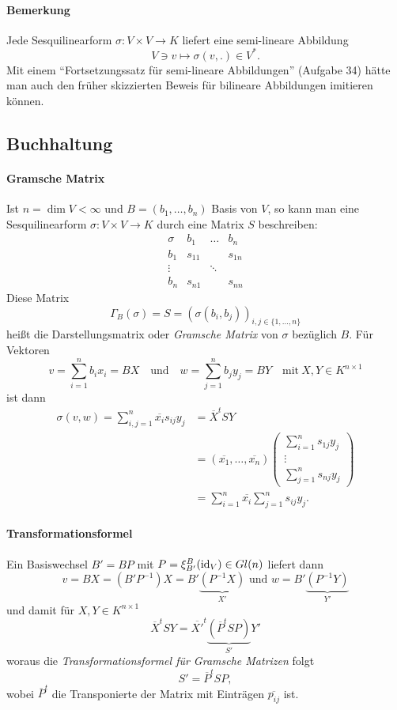 \paragraph{Bemerkung}
	Jede Sesquilinearform $ \sigma: V\times V\to K $ liefert eine semi-lineare Abbildung
		\[ V\ni v\mapsto \sigma(v,.)\in V^*. \]
	Mit einem "`Fortsetzungssatz für semi-lineare Abbildungen"' (Aufgabe 34) hätte man auch den früher skizzierten Beweis für bilineare Abbildungen imitieren können.

\subsection{Buchhaltung}
\paragraph{Gramsche Matrix}
	Ist $ n=\dim V < \infty $ und $ B=(b_1,\dots,b_n) $ Basis von $ V $, so kann man eine Sesquilinearform $ \sigma: V\times V\to K $ durch eine Matrix $ S $ beschreiben:
	\[ \begin{array}{c|ccc}
		\sigma &  b_1   & \dots  &  b_n   \\ \hline
		 b_1   & s_{11} &        & s_{1n} \\
		\vdots &        & \ddots &  	  \\
		 b_n   & s_{n1} &        & s_{nn}
	\end{array}  \]
	Diese Matrix
		\[ \Gamma_B(\sigma) = S = \left(\sigma(b_i,b_j)\right)_{i,j\in \{1,\dots,n\}} \]
	heißt die Darstellungsmatrix oder \emph{Gramsche Matrix} von $ \sigma $ bezüglich $ B $. Für Vektoren
		\[ v = \sum_{i=1}^{n}b_ix_i = BX \quad\text{und}\quad w = \sum_{j=1}^{n}b_jy_j = BY \quad\text{mit}\ X,Y \in K^{n\times 1} \]
	ist dann
	\begin{align*}
		 \sigma(v,w) = \sum_{i,j=1}^{n}\overline{x_i}s_{ij}y_j &= \overline{X}^tSY \\
		 &= (\overline{x_1},\dots,\overline{x_n})
			\begin{pmatrix}
				\sum_{i=1}^{n}s_{1j}y_j\\ \vdots\\ \sum_{j=1}^{n}s_{nj}y_j
			\end{pmatrix}\\
		 &= \sum_{i=1}^{n}\overline{x_i}\sum_{j=1}^{n}s_{ij}y_j.
	\end{align*}
\paragraph{Transformationsformel}
	Ein Basiswechsel $ B' = BP $ mit $ P = \xi_{B'}^B(\operatorname{id}_V) \in Gl(n)$ liefert dann
		\[ v = BX = (B'P^{-1})X = B' \underbrace{(P^{-1}X)}_{X'} \text{ und } w = B' \underbrace{(P^{-1}Y)}_{Y'} \]
	und damit für $ X,Y \in K^{n\times 1} $
		\[ \overline{X}^tSY = \overline{X'}^t \underbrace{(\overline{P}^tSP)}_{S'} Y' \]
	woraus die \emph{Transformationsformel für Gramsche Matrizen} folgt
		\[ S' = \overline{P}^tSP, \]
	wobei $ \overline{P}^t $ die Transponierte der Matrix mit Einträgen $ \overline{p_{ij}} $ ist.
